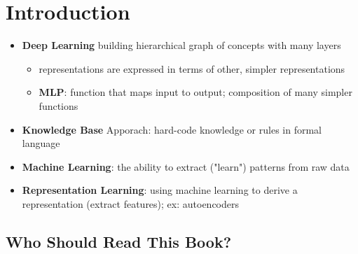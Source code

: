 \section{Introduction}\label{sec:introduction}
\begin{itemize}
    \item \textbf{Deep Learning} building hierarchical graph of concepts with many layers
    \begin{itemize}
        \item representations are expressed in terms of other, simpler representations
        \item \textbf{MLP}: function that maps input to output; composition of many simpler functions
    \end{itemize}
    \item \textbf{Knowledge Base} Apporach: hard-code knowledge or rules in formal language
    \item \textbf{Machine Learning}: the ability to extract ("learn") patterns from raw data
    \item \textbf{Representation Learning}: using machine learning to derive a representation (extract features); ex: autoencoders
\end{itemize}

\subsection{Who Should Read This Book?}

